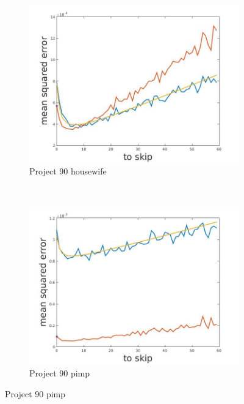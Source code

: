 \documentclass[12pt]{report}
\begin{document}
\begin{figure}[h]
\begin{subfigure}[b]{0.3\textwidth}
    \end{subfigure}
    ~
    \begin{subfigure}[b]{0.3\textwidth}
        \includegraphics[width=\textwidth]{estimators_housewife}
        \caption{ Project 90 housewife}

    \end{subfigure}
    ~
    \begin{subfigure}[b]{0.3\textwidth}
        \includegraphics[width=\textwidth]{estimators_pimp}
        \caption{ Project 90 pimp }

    \end{subfigure}
    

\end{figure}
\end{document}

